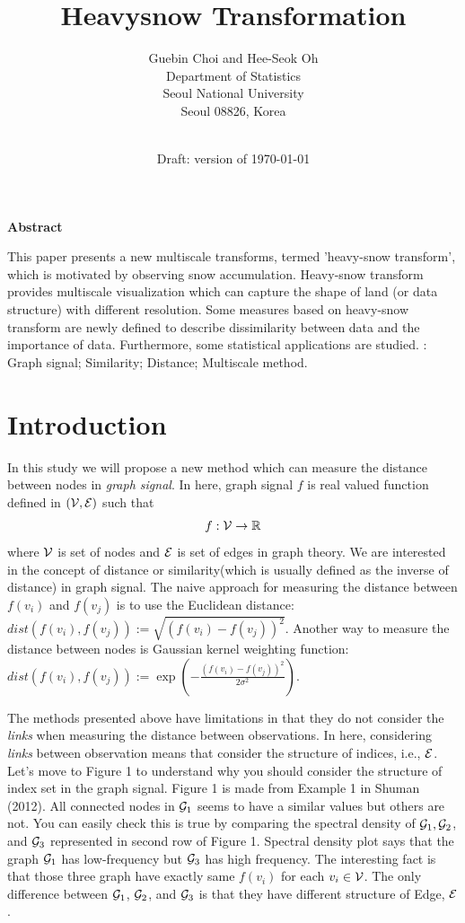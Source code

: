 \documentclass[preprint, review, 12pt]{article}
\title{\bf Heavysnow Transformation}
\author{
\sc  Guebin Choi and Hee-Seok Oh\\ 
Department of Statistics\\
Seoul National University\\
Seoul 08826, Korea \\
\\
}
\date{Draft: version of \today}
\theoremstyle{definition}
\theoremstyle{remark}
\begin{document}
\maketitle

\newpage
\thispagestyle{empty}

\begin{center}
{\bf Abstract}
\end{center}
\noindent 
This paper presents a new multiscale transforms, termed 'heavy-snow transform', which is motivated by observing snow accumulation. Heavy-snow transform provides multiscale visualization which can capture the shape of land (or data structure) with different resolution. Some measures based on heavy-snow transform are newly defined to describe dissimilarity between data and the importance of data. Furthermore, some statistical applications are studied. 
\vskip 5mm
: Graph signal; Similarity; Distance; Multiscale method. 
\newpage


\section{Introduction}
In this study we will propose a new method which can measure the distance between nodes in \emph{graph signal}. In here, graph signal $f$ is real valued function defined in $({\cal V},{\cal E})$ such that 
\[
f: {\cal V} \to \mathbb{R} 
\]
where ${\cal V}$ is set of nodes and ${\cal E}$ is set of edges in graph theory. We are interested in the concept of distance or similarity(which is usually defined as the inverse of distance) in graph signal. The naive approach for measuring the distance between $f(v_i)$ and $f(v_j)$ is to use the Euclidean distance: 
$
dist(f(v_i),f(v_j)):=\sqrt{(f(v_i)-f(v_j))^2}.
$
Another way to measure the distance between nodes is Gaussian kernel weighting function: 
$
dist(f(v_i),f(v_j)):=\exp\left(-\frac{(f(v_i)-f(v_j))^2}{2\sigma^2} \right).
$

The methods presented above have limitations in that they do not consider the \emph{links} when measuring the distance between observations. In here, considering \emph{links} between observation means that consider the structure of indices, i.e., ${\cal E}$. Let's move to Figure 1 to understand why you should consider the structure of index set in the graph signal. Figure 1 is made from Example 1 in Shuman (2012).  All connected nodes in ${\cal G}_1$ seems to have a similar values but others are not. You can easily check this is true by  comparing the spectral density of ${\cal G}_1, {\cal G}_2$, and ${\cal G}_3$ represented in second row of Figure 1. Spectral density plot says that the graph ${\cal G}_1$ has low-frequency but ${\cal G}_3$ has  high frequency. The interesting fact is that those three graph have exactly same $f(v_i)$ for each $v_i \in {\cal V}$. The only difference between ${\cal G}_1$, ${\cal G}_2$, and ${\cal G}_3$ is that they have different structure of Edge, ${\cal E}$. 
\end{document}
